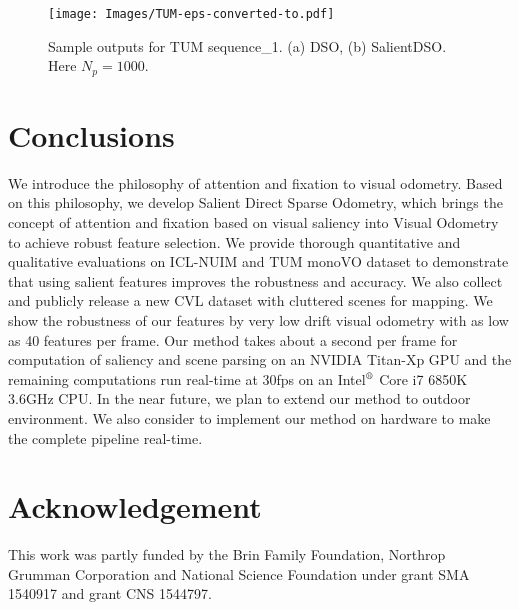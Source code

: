 \documentclass[letterpaper, 10 pt, conference]{ieeeconf}  %
\begin{document}
\begin{figure}[t!]
    \centering
    \texttt{[image: Images/TUM-eps-converted-to.pdf]}
    \caption{Sample outputs for TUM sequence\_1. (a) DSO, (b) SalientDSO. Here $N_p=1000$.}
    \label{fig:TUM}
\end{figure}

\section{Conclusions}
\label{sec:Conc}
We introduce the philosophy of attention and fixation to visual odometry. Based on this philosophy, we develop Salient Direct Sparse Odometry, which brings the concept of attention and fixation based on visual saliency into Visual Odometry to achieve robust feature selection. We provide thorough quantitative and qualitative evaluations on ICL-NUIM and TUM monoVO dataset to demonstrate that using salient features improves the robustness and accuracy. We also collect and publicly release a new CVL dataset with cluttered scenes for mapping. We show the robustness of our features by very low drift visual odometry with as low as 40 features per frame. Our method takes about a second per frame for computation of saliency and scene parsing on an NVIDIA Titan-Xp GPU and the remaining computations run real-time at 30fps on an Intel$^\text{\textregistered}$ Core i7 6850K 3.6GHz CPU. In the near future, we plan to extend our method to outdoor environment. We also consider to implement our method on hardware to make the complete pipeline real-time.

\section*{Acknowledgement}
This work was partly funded by the Brin Family Foundation, Northrop Grumman Corporation and National Science Foundation under grant SMA 1540917 and grant CNS 1544797. 


\end{document}
